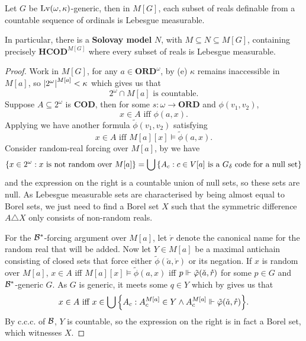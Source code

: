 \begin{theorem}
    Let \(G\) be \(\operatorname{Lv}(\omega,\kappa)\)-generic,
    then in \(M[G]\), each subset of reals definable from a countable sequence of ordinals is Lebesgue measurable.

    In particular, there is a \textbf{Solovay model} \(N\), with \(M \subseteq N \subseteq M[G]\),
    containing precisely \(\mathbf{HCOD}^{M[G]}\) where every subset of reals is Lebesgue measurable.
\end{theorem}
\begin{proof}
    Work in \(M[G]\),
    for any \(a\in\mathbf{ORD}^\omega\),
    by  (e) \(\kappa\) remains inaccessible in \(M[a]\),
    so \(\left\lvert 2^\omega \right\rvert^{M[a]} < \kappa\) which gives us that
    \[ 2^\omega \cap M[a] \text{ is countable}. \]
    Suppose \(A\subseteq 2^\omega\) is \(\mathbf{COD}\), then for some \(s:\omega\to\mathbf{ORD}\) and \(\phi(v_1,v_2)\),
    \[ x\in A \text{ iff } \phi(a,x). \]
    Applying  we have another formula \(\tilde{\phi}(v_1,v_2)\) satisfying
    \[ x\in A \text{ iff } M[a][x] \models \tilde{\phi}(a,x). \]
    Consider random-real forcing over \(M[a]\), by  we have
    \[
        {\left\{ x\in2^\omega: x\text{ is not random over } M[a] \right\}}
        = \bigcup {\left\{ A_c: c\in V[a] \text{ is a } G_\delta \text{ code for a null set} \right\}}
    \]
    and the expression on the right is a countable union of null sets, so these sets are null.
    As Lebesgue measurable sets are characterised by being almost equal to Borel sets,
    we just need to find a Borel set \(X\) such that the symmetric difference \(A\triangle X\) only consists of non-random reals.

    For the \({\mathcal{B}}^*\)-forcing argument over \(M[a]\),
    let \(\mathring{r}\) denote the canonical name for the random real that will be added.
    Now let \(Y \in M[a]\) be a maximal antichain consisting of closed sets
    that force either \(\tilde{\phi}(\check{a},\mathring{r})\) or its negation.
    If \(x\) is random over \(M[a]\),
    \(x\in A\) iff \(M[a][x]\models \tilde{\phi}(a,x)\)
    iff \(p\Vdash \tilde{\varphi}(\check{a},\mathring{r})\) for some \(p\in G\) and \({\mathcal{B}}^*\)-generic \(G\).
    As \(G\) is generic, it meets some \(q\in Y\) which by  gives us that
    \[ x\in A\text{ iff } x\in \bigcup{\left\{ A_c: A_c^{M[a]}\in Y\land A_c^{M[a]} \Vdash\tilde{\varphi}(\check{a},\mathring{r}) \right\}}. \]
    By c.c.c. of \({\mathcal{B}}\), \(Y\) is countable, so the expression on the right is in fact a Borel set,
    which witnesses \(X\).
\end{proof}
